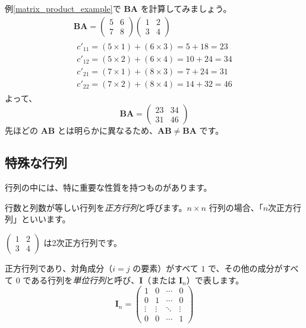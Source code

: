\begin{ex}[交換法則が成り立たない例]
例\ref{matrix_product_example}で $\bm{B}\bm{A}$ を計算してみましょう。
\begin{gather*}
\bm{B}\bm{A} = \begin{pmatrix} 5 & 6 \\ 7 & 8 \end{pmatrix} \begin{pmatrix} 1 & 2 \\ 3 & 4 \end{pmatrix}\\
\begin{aligned}
c'_{11} = (5 \times 1) + (6 \times 3) = 5 + 18 = 23\\
c'_{12} = (5 \times 2) + (6 \times 4) = 10 + 24 = 34\\
c'_{21} = (7 \times 1) + (8 \times 3) = 7 + 24 = 31\\
c'_{22} = (7 \times 2) + (8 \times 4) = 14 + 32 = 46
\end{aligned}
\end{gather*}
よって、
\[\bm{B}\bm{A} = \begin{pmatrix} 23 & 34 \\ 31 & 46 \end{pmatrix}\]
先ほどの $\bm{A}\bm{B}$ とは明らかに異なるため、$\bm{A}\bm{B} \neq \bm{B}\bm{A}$ です。
\end{ex}

\subsection{特殊な行列}

行列の中には、特に重要な性質を持つものがあります。

\begin{dfn}[正方行列] \label{square_matrix}
行数と列数が等しい行列を\emph{正方行列}と呼びます。$n \times n$ 行列の場合、「$n$次正方行列」といいます。
\end{dfn}

\begin{ex}
$\begin{pmatrix} 1 & 2 \\ 3 & 4 \end{pmatrix}$ は2次正方行列です。
\end{ex}

\begin{dfn}[単位行列] \label{identity_matrix}
正方行列であり、対角成分（$i=j$ の要素）がすべて $1$ で、その他の成分がすべて $0$ である行列を\emph{単位行列}と呼び、$\bm{I}$（または $\bm{I}_n$）で表します。
\[\bm{I}_n = \begin{pmatrix}
1 & 0 & \cdots & 0 \\
0 & 1 & \cdots & 0 \\
\vdots & \vdots & \ddots & \vdots \\
0 & 0 & \cdots & 1
\end{pmatrix}\]
\end{dfn}

